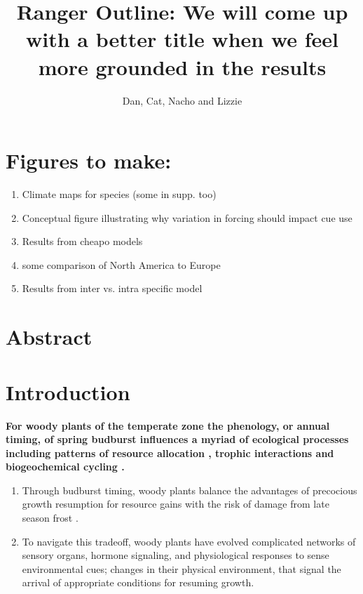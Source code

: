 \documentclass[11pt]{article}\usepackage[]{graphicx}\usepackage[]{color}
\title{Ranger Outline: We will come up with a better title when we feel more grounded in the results}
\date{}
\author{Dan, Cat, Nacho and Lizzie}
\begin{document}
\maketitle
\section*{Figures to make:}
\begin{enumerate}
\item Climate maps for species (some in supp. too)
\item Conceptual figure illustrating why variation in forcing should impact cue use
\item Results from cheapo models
\item some comparison of North America to Europe
\item Results from inter vs. intra specific model

\end{enumerate}
\section*{Abstract}
\section*{Introduction}
\textbf{For woody plants of the temperate zone the phenology, or annual timing, of spring budburst influences a myriad of ecological processes including patterns of resource allocation \citep{}, trophic interactions \citep{} and biogeochemical cycling \citep{}.}
\begin{enumerate}
\item Through budburst timing, woody plants balance the advantages of precocious growth resumption for resource gains with the risk of damage from late season frost \citep{}.
\item To navigate this tradeoff, woody plants have evolved complicated networks of sensory organs, hormone signaling, and physiological responses to sense environmental cues; changes in their physical environment, that signal the arrival of appropriate conditions for resuming growth.
\end{enumerate}
\end{document}
